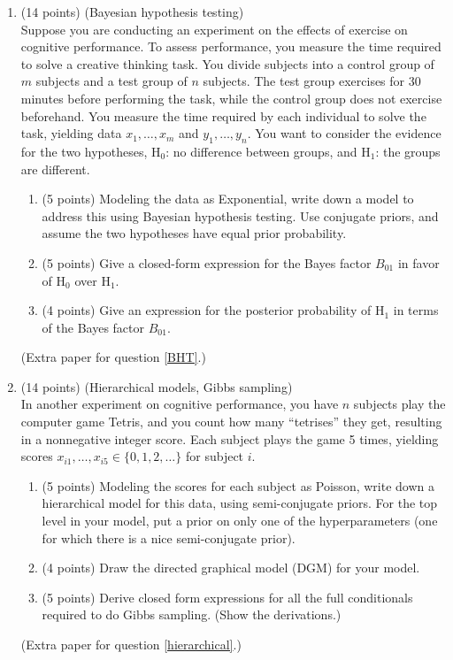 \documentclass[12pt]{article}
\renewcommand{\H}{\mathrm{H}}
\begin{document}
\begin{enumerate}
    
    
    
\newpage
\item\label{BHT} (14 points) (Bayesian hypothesis testing)\\
    Suppose you are conducting an experiment on the effects of exercise on cognitive performance.  
    To assess performance, you measure the time required to solve a creative thinking task.
    You divide subjects into a control group of $m$ subjects and a test group of $n$ subjects.
    The test group exercises for 30 minutes before performing the task, while the control group does not exercise beforehand.
    You measure the time required by each individual to solve the task, yielding data $x_1,\ldots,x_m$ and $y_1,\ldots,y_n$.
    You want to consider the evidence for the two hypotheses, $\H_0$: no difference between groups, and $\H_1$: the groups are different.
    \vspace{1em}
    \begin{enumerate}
        \setlength\itemsep{1em}
        \item (5 points) Modeling the data as Exponential, write down a model to address this using Bayesian hypothesis testing.
            Use conjugate priors, and assume the two hypotheses have equal prior probability.
        \item (5 points) Give a closed-form expression for the Bayes factor $B_{0 1}$ in favor of $\H_0$ over $\H_1$.
        \item (4 points) Give an expression for the posterior probability of $\H_1$ in terms of the Bayes factor $B_{0 1}$.
    \end{enumerate}
\newpage
(Extra paper for question \ref{BHT}.)




\newpage
\item\label{hierarchical} (14 points) (Hierarchical models, Gibbs sampling)\\
    In another experiment on cognitive performance, you have $n$ subjects play the computer game Tetris, and you count how many 
    ``tetrises'' they get, resulting in a nonnegative integer score. Each subject plays the game 5 times, yielding 
    scores $x_{i 1},\ldots,x_{i 5}\in\{0,1,2,\ldots\}$ for subject $i$.
    \vspace{1em}
    \begin{enumerate}
        \setlength\itemsep{1em}
        \item (5 points) Modeling the scores for each subject as Poisson, write down a hierarchical model for this data,
            using semi-conjugate priors. For the top level in your model, put a prior on only one of the hyperparameters
            (one for which there is a nice semi-conjugate prior).
        \item (4 points) Draw the directed graphical model (DGM) for your model.
        \item (5 points) Derive closed form expressions for all the full conditionals required to do Gibbs sampling.
            (Show the derivations.)
    \end{enumerate}
\newpage
(Extra paper for question \ref{hierarchical}.)


\end{enumerate}
\end{document}
